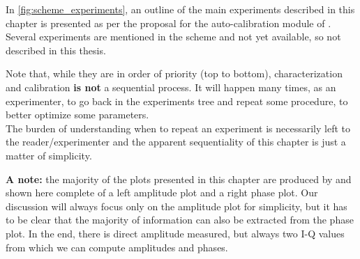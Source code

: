 In \cref{fig:scheme_experiments}, an outline of the main experiments described in this chapter is presented as per the proposal for the auto-calibration module of \Qibocal. Several experiments are mentioned in the scheme and not yet available, so not described in this thesis.

Note that, while they are in order of priority (top to bottom), characterization and calibration \textbf{is not} a sequential process.
It will happen many times, as an experimenter, to go back in the experiments tree and repeat some procedure, to better optimize some parameters.\\
The burden of understanding when to repeat an experiment is necessarily left to the reader/experimenter and the apparent sequentiality of this chapter is just a matter of simplicity.

\vspace{1cm}

\textbf{A note:} the majority of the plots presented in this chapter are produced by \Qibocal and shown here complete of a left amplitude plot and a right phase plot.
Our discussion will always focus only on the amplitude plot for simplicity, but it has to be clear that the majority of information can also be extracted from the phase plot.
In the end, there is direct amplitude measured, but always two I-Q values from which we can compute amplitudes and phases.